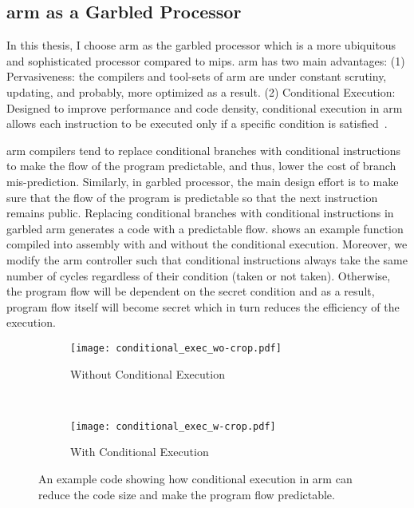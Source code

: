 \subsection{\gls{arm} as a Garbled Processor}\label{ssec:arm}
In this thesis, I choose \gls{arm} as the garbled processor which is a more ubiquitous and sophisticated processor compared to \gls{mips}.
\gls{arm} has two main advantages:
(1) Pervasiveness: the compilers and tool-sets of \gls{arm} are under constant scrutiny, updating, and probably, more optimized as a result.
(2) Conditional Execution: Designed to improve performance and code density, conditional execution in \gls{arm} allows each instruction to be executed only if a specific condition is satisfied~\cite{sloss2004arm}.

\gls{arm} compilers tend to replace conditional branches with conditional instructions to make the flow of the program predictable, and thus, lower the cost of branch mis-prediction.
Similarly, in garbled processor, the main design effort is to make sure that the flow of the program is predictable so that the next instruction remains public.
Replacing conditional branches with conditional instructions in garbled \gls{arm} generates a code with a predictable flow.
 shows an example function compiled into assembly with and without the conditional execution.
Moreover, we modify the \gls{arm} controller such that conditional instructions always take the same number of cycles regardless of their condition (taken or not taken).
Otherwise, the program flow will be dependent on the secret condition and as a result, program flow itself will become secret which in turn reduces the efficiency of the execution.

\begin{figure}[h]
    \centering
    \begin{subfigure}{0.40\columnwidth}
        \centering
        \texttt{[image: conditional\_exec\_wo-crop.pdf]}
        \caption{Without Conditional Execution}
    \end{subfigure}
    ~
    \begin{subfigure}{0.40\columnwidth}
        \centering
        \texttt{[image: conditional\_exec\_w-crop.pdf]}
        \caption{With Conditional Execution}
    \end{subfigure}
    \caption{An example code showing how conditional execution in \gls{arm} can reduce the code size and make the program flow predictable.}\label{fig:conditional_exec}
\end{figure}

